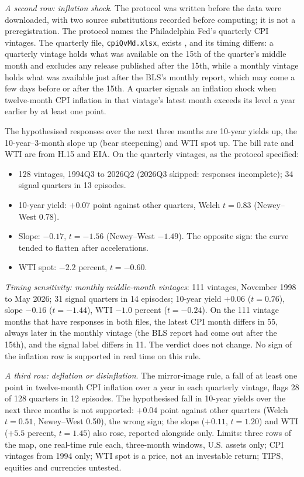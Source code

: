 \begin{qfdefinition}
\emph{A second row: inflation shock}. The protocol was written before the data were downloaded, with two source substitutions recorded before computing; it is not a preregistration. The protocol names the Philadelphia Fed's quarterly CPI vintages. The quarterly file, \texttt{cpiQvMd.xlsx}, exists \citep[CPI data-files page, dated 2 October 2026; specific notes for CPI and PCPI; general notes, sec.~II and IV]{philfed-rtdsm-cpi}, and its timing differs: a quarterly vintage holds what was available on the 15th of the quarter's middle month and excludes any release published after the 15th, while a monthly vintage holds what was available just after the BLS's monthly report, which may come a few days before or after the 15th. A quarter signals an inflation shock when twelve-month CPI inflation in that vintage's latest month exceeds its level a year earlier by at least one point.

The hypothesised responses over the next three months are 10-year yields up, the 10-year--3-month slope up (bear steepening) and WTI spot up. The bill rate and WTI are from H.15 and EIA.
On the quarterly vintages, as the protocol specified:
\begin{itemize}
\item 128 vintages, 1994Q3 to 2026Q2 (2026Q3 skipped: responses incomplete); 34 signal quarters in 13 episodes.
\item 10-year yield: $+0.07$ point against other quarters, Welch $t=0.83$ (Newey--West 0.78).
\item Slope: $-0.17$, $t=-1.56$ (Newey--West $-1.49$). The opposite sign: the curve tended to flatten after accelerations.
\item WTI spot: $-2.2$ percent, $t=-0.60$.
\end{itemize}
\emph{Timing sensitivity: monthly middle-month vintages}: 111 vintages, November 1998 to May 2026; 31 signal quarters in 14 episodes; 10-year yield $+0.06$ ($t=0.76$), slope $-0.16$ ($t=-1.44$), WTI $-1.0$ percent ($t=-0.24$). On the 111 vintage months that have responses in both files, the latest CPI month differs in 55, always later in the monthly vintage (the BLS report had come out after the 15th), and the signal label differs in 11. The verdict does not change. No sign of the inflation row is supported in real time on this rule.

\emph{A third row: deflation or disinflation}. The mirror-image rule, a fall of at least one point in twelve-month CPI inflation over a year in each quarterly vintage, flags 28 of 128 quarters in 12 episodes. The hypothesised fall in 10-year yields over the next three months is not supported: $+0.04$ point against other quarters (Welch $t=0.51$, Newey--West 0.50), the wrong sign; the slope ($+0.11$, $t=1.20$) and WTI ($+5.5$ percent, $t=1.45$) also rose, reported alongside only. Limits: three rows of the map, one real-time rule each, three-month windows, U.S. assets only; CPI vintages from 1994 only; WTI spot is a price, not an investable return; TIPS, equities and currencies untested.


\end{qfdefinition}
